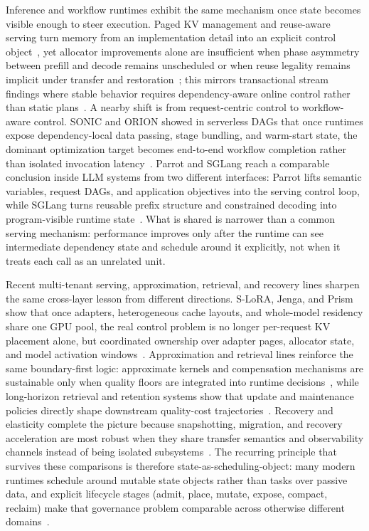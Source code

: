 \documentclass[acmsmall,screen,review]{acmart}
\begin{document}
Inference and workflow runtimes exhibit the same mechanism once state becomes visible enough to steer execution. Paged KV management and reuse-aware serving turn memory from an implementation detail into an explicit control object~\cite{kwon2023pagedattention,zheng2023sglang}, yet allocator improvements alone are insufficient when phase asymmetry between prefill and decode remains unscheduled or when reuse legality remains implicit under transfer and restoration~\cite{agrawal2024sarathi,holmes2024fastgen}; this mirrors transactional stream findings where stable behavior requires dependency-aware online control rather than static plans~\cite{mao2023morphstream}. A nearby shift is from request-centric control to workflow-aware control. SONIC and ORION showed in serverless DAGs that once runtimes expose dependency-local data passing, stage bundling, and warm-start state, the dominant optimization target becomes end-to-end workflow completion rather than isolated invocation latency~\cite{mahgoub2021sonic,mahgoub2022orion}. Parrot and SGLang reach a comparable conclusion inside LLM systems from two different interfaces: Parrot lifts semantic variables, request DAGs, and application objectives into the serving control loop, while SGLang turns reusable prefix structure and constrained decoding into program-visible runtime state~\cite{lin2024parrot,zheng2023sglang}. What is shared is narrower than a common serving mechanism: performance improves only after the runtime can see intermediate dependency state and schedule around it explicitly, not when it treats each call as an unrelated unit.

Recent multi-tenant serving, approximation, retrieval, and recovery lines sharpen the same cross-layer lesson from different directions. S-LoRA, Jenga, and Prism show that once adapters, heterogeneous cache layouts, and whole-model residency share one GPU pool, the real control problem is no longer per-request KV placement alone, but coordinated ownership over adapter pages, allocator state, and model activation windows~\cite{sheng2023slora,zhang2025jenga,yu2025prism}. Approximation and retrieval lines reinforce the same boundary-first logic: approximate kernels and compensation mechanisms are sustainable only when quality floors are integrated into runtime decisions~\cite{zeng2024pecj,zeng2024libamm}, while long-horizon retrieval and retention systems show that update and maintenance policies directly shape downstream quality-cost trajectories~\cite{zhou2025ferret,zhang2026flowrag}. Recovery and elasticity complete the picture because snapshotting, migration, and recovery acceleration are most robust when they share transfer semantics and observability channels instead of being isolated subsystems~\cite{carbone2015asynchronous,fernandez2013osm,zhao2024recovery}. The recurring principle that survives these comparisons is therefore state-as-scheduling-object: many modern runtimes schedule around mutable state objects rather than tasks over passive data, and explicit lifecycle stages (admit, place, mutate, expose, compact, reclaim) make that governance problem comparable across otherwise different domains~\cite{zheng2023sglang,lin2024parrot,mahgoub2021sonic,mahgoub2022orion,zhong2024distserve,patel2024splitwise}.
\end{document}
